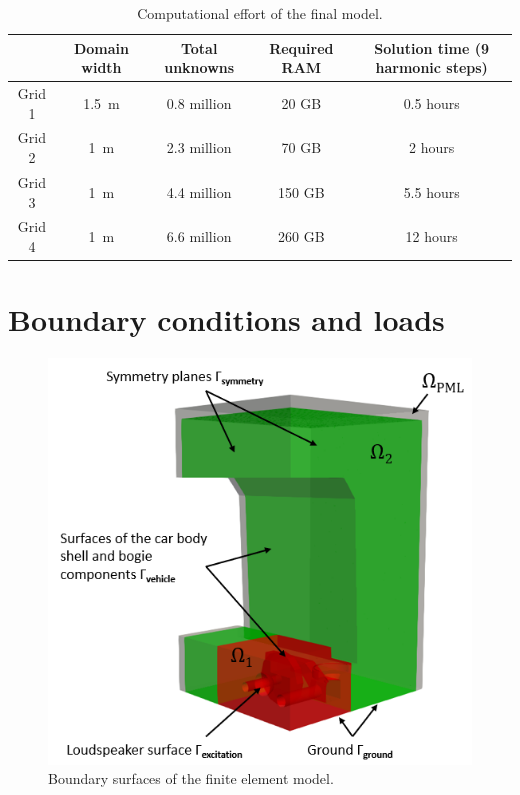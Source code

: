{\begin{table}[H]
	\centering
	\caption{Computational effort of the final model.}
	\label{tab:computational_effort}
	\begin{tabular}{ccccc}
		\toprule
		& Domain width & Total unknowns & Required RAM & Solution time (9 harmonic steps) \\
		\midrule
		Grid 1 & \SI{1.5}{\meter} & 0.8 million & 20 GB & 0.5 hours \\
		Grid 2 & \SI{1}{\meter} & 2.3 million & 70 GB & 2 hours \\
		Grid 3 & \SI{1}{\meter} & 4.4 million & 150 GB & 5.5 hours \\
		Grid 4 & \SI{1}{\meter} & 6.6 million & 260 GB & 12 hours \\
		\bottomrule
	\end{tabular}
\end{table}



\newpage
\section{Boundary conditions and loads}
\label{section:boundary_conditions}

\begin{figure}
	\centering
	\includegraphics{fig/chap4/region_labels.png}
	\caption{Boundary surfaces of the finite element model.}
	\label{fig:boundary_conditions}
\end{figure}

}
